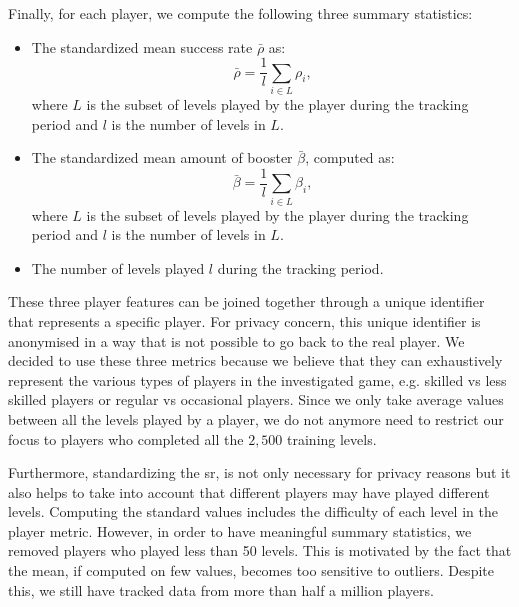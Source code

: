 Finally, for each player, we compute the following three summary statistics:
\begin{itemize}
    \item The standardized mean success rate $\bar{\rho}$ as:
        \begin{equation}
            \bar{\rho}  = \frac{1}{l} \sum_{i \in L} \rho_i \text{,}
        \end{equation}
    where $L$ is the subset of levels played by the player during the tracking period and $l$ is the number of levels in $L$.
    \item The standardized mean amount of booster $\bar{\beta}$, computed as:
        \begin{equation}
            \bar{\beta} = \frac{1}{l} \sum_{i \in L} \beta_i \text{,}
        \end{equation}
    where $L$ is the subset of levels played by the player during the tracking period and $l$ is the number of levels in $L$.
    \item The number of levels played $l$ during the tracking period.
\end{itemize}
\noindent
These three player features can be joined together through a unique identifier that represents a specific player. For privacy concern, this unique identifier is anonymised in a way that is not possible to go back to the real player. We decided to use these three metrics because we believe that they can exhaustively represent the various types of players in the investigated game, e.g. skilled vs less skilled players or regular vs occasional players. Since we only take average values between all the levels played by a player, we do not anymore need to restrict our focus to players who completed all the $2,500$ training levels. 

Furthermore, standardizing the \acs{sr}, is not only necessary for privacy reasons but it also helps to take into account that different players may have played different levels. Computing the standard values includes the difficulty of each level in the player metric. However, in order to have meaningful summary statistics, we removed players who played less than 50 levels. This is motivated by the fact that the mean, if computed on few values, becomes too sensitive to outliers. Despite this, we still have tracked data from more than half a million players.


